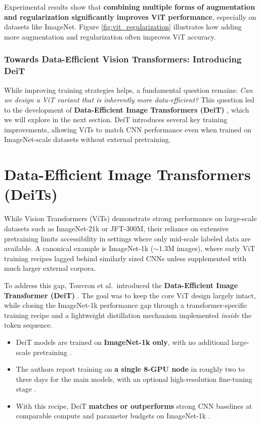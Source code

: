 \noindent
Experimental results show that \textbf{combining multiple forms of augmentation and regularization significantly improves ViT performance}, especially on datasets like ImageNet. Figure \ref{fig:vit_regularization} illustrates how adding more augmentation and regularization often improves ViT accuracy.

\subsubsection{Towards Data-Efficient Vision Transformers: Introducing DeiT}
\noindent
While improving training strategies helps, a fundamental question remains: \emph{Can we design a ViT variant that is inherently more data-efficient?} This question led to the development of \textbf{Data-Efficient Image Transformers (DeiT)} \cite{touvron2021_deit}, which we will explore in the next section. DeiT introduces several key training improvements, allowing ViTs to match CNN performance even when trained on ImageNet-scale datasets without external pretraining.

\newpage

\section{Data-Efficient Image Transformers (DeiTs)}
\label{sec:chapter18_deit}

\noindent
While Vision Transformers (ViTs) demonstrate strong performance on large-scale datasets such as ImageNet-21k or JFT-300M, their reliance on extensive pretraining limits accessibility in settings where only mid-scale labeled data are available. A canonical example is ImageNet-1k (\(\sim\)1.3M images), where early ViT training recipes lagged behind similarly sized CNNs unless supplemented with much larger external corpora.

\noindent
To address this gap, Touvron et al.\ introduced the \textbf{Data-Efficient Image Transformer (DeiT)} \cite{touvron2021_deit}. The goal was to keep the core ViT design largely intact, while closing the ImageNet-1k performance gap through a transformer-specific training recipe and a lightweight distillation mechanism implemented \emph{inside} the token sequence.

\begin{itemize}
	\item DeiT models are trained on \textbf{ImageNet-1k only}, with no additional large-scale pretraining \cite{touvron2021_deit}.
	\item The authors report training on \textbf{a single 8-GPU node} in roughly two to three days for the main models, with an optional high-resolution fine-tuning stage \cite{touvron2021_deit}.
	\item With this recipe, DeiT \textbf{matches or outperforms} strong CNN baselines at comparable compute and parameter budgets on ImageNet-1k \cite{touvron2021_deit}.
\end{itemize}

